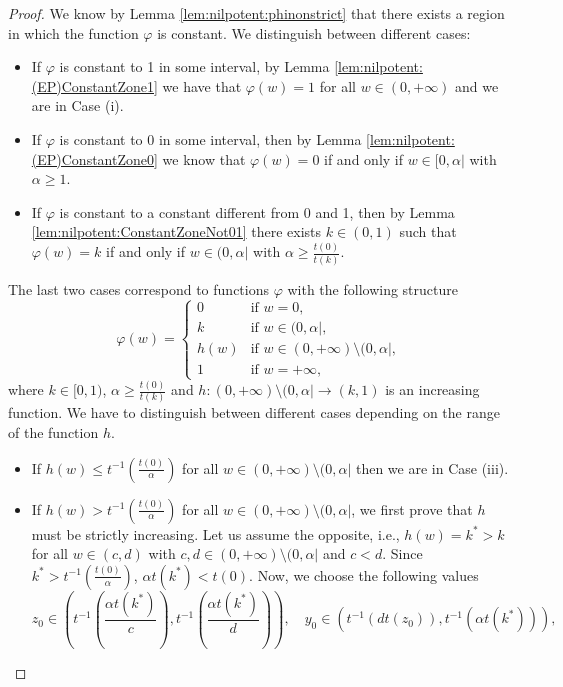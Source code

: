 \begin{proof}
	We know by Lemma \ref{lem:nilpotent:phinonstrict} that there exists a region in which the function $\varphi$ is constant. We distinguish between different cases:
	\begin{itemize}
		\item If $\varphi$ is constant to 1 in some interval, by Lemma \ref{lem:nilpotent:(EP)ConstantZone1} we have that $\varphi(w)=1$ for all $w \in (0,+\infty)$ and we are in Case (i).
		\item If $\varphi$ is constant to 0 in some interval, then by Lemma \ref{lem:nilpotent:(EP)ConstantZone0} we know that $\varphi(w)=0$ if and only if $w \in [0,\alpha|$ with $\alpha \geq 1$.
		\item If $\varphi$ is constant to a constant different from 0 and 1, then by Lemma \ref{lem:nilpotent:ConstantZoneNot01} there exists $k \in (0,1)$ such that $\varphi(w)=k$ if and only if $w \in (0,\alpha|$ with $\alpha \geq \frac{t(0)}{t(k)}$.
	\end{itemize}
	The last two cases correspond to functions $\varphi$ with the following structure
	$$
	\varphi(w)
	=
	\left\{ \begin{array}{ll}
		0 &   \text{if }   w=0, \\
		k &   \text{if }   w \in (0,\alpha|, \\
		h(w) &  \text{if }  w \in (0,+\infty) \setminus (0,\alpha|, \\
		1 & \text{if } w=+\infty,
	\end{array}
	\right.
	$$
	where $k \in [0,1)$, $\alpha \geq \frac{t(0)}{t(k)}$ and $h: (0,+\infty) \setminus (0,\alpha| \to (k,1)$ is an increasing function. We have to distinguish between different cases depending on the range of the function $h$.
	\begin{itemize}
		\item If $h(w) \leq t^{-1}\left(\frac{t(0)}{\alpha}\right)$ for all $w \in (0,+\infty) \setminus (0,\alpha|$ then we are in Case (iii).
		\item If $h(w) > t^{-1} \left(\frac{t(0)}{\alpha}\right)$ for all $w \in (0,+\infty) \setminus (0,\alpha|$, we first prove that $h$ must be strictly increasing. Let us assume the opposite, i.e., $h(w)=k^*>k$ for all $w \in (c,d)$ with $c,d \in (0,+\infty) \setminus (0,\alpha|$ and $c<d$. Since $k^* > t^{-1} \left(\frac{t(0)}{\alpha}\right)$, $\alpha t(k^*) < t(0)$. Now, we choose the following values 
		$$z_0 \in \left(t^{-1} \left(\frac{\alpha t(k^*)}{c}\right), t^{-1} \left(\frac{\alpha t(k^*)}{d}\right) \right), \quad y_0 \in (t^{-1}(dt(z_0)),t^{-1}(\alpha t(k^*))),$$

\end{itemize}
\end{proof}
